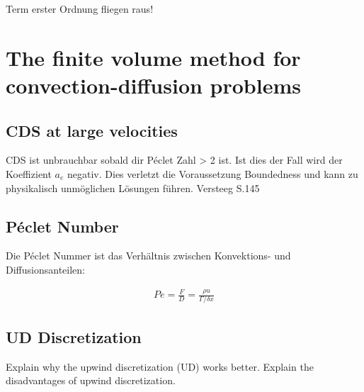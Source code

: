 \documentclass[a4paper]{scrartcl}
\begin{document}
Term erster Ordnung fliegen raus!
\section{The finite volume method for convection-diffusion problems}
\subsection{CDS at large velocities}
CDS ist unbrauchbar sobald dir Péclet Zahl > 2 ist. Ist dies der Fall wird der
Koeffizient $a_e$ negativ. Dies verletzt die Voraussetzung Boundedness und kann
zu physikalisch unmöglichen Lösungen führen. Versteeg S.145
\subsection{Péclet Number}
Die Péclet Nummer ist das Verhältnis zwischen Konvektions- und
Diffusionsanteilen:

\begin{align}
Pe=\frac{F}{D} = \frac{\rho u}{\Gamma / \delta x}
\end{align}
\subsection{UD Discretization}
Explain why the upwind discretization (UD) works better. Explain the disadvantages of upwind discretization.
\end{document}

